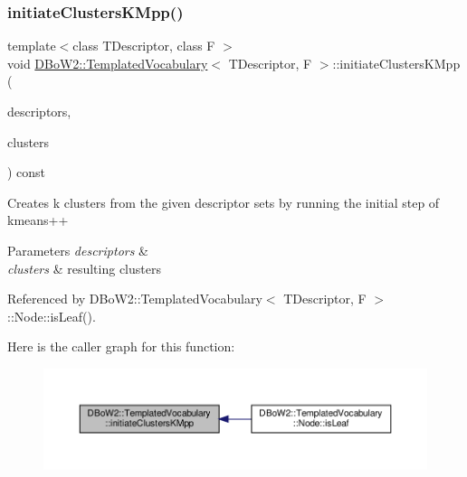 \subsubsection{\texorpdfstring{initiate\+Clusters\+K\+Mpp()}{initiateClustersKMpp()}}
{\footnotesize\ttfamily template$<$class T\+Descriptor, class F $>$ \\
void \hyperlink{classDBoW2_1_1TemplatedVocabulary}{D\+Bo\+W2\+::\+Templated\+Vocabulary}$<$ T\+Descriptor, F $>$\+::initiate\+Clusters\+K\+Mpp (\begin{DoxyParamCaption}\item[{const std\+::vector$<$ \hyperlink{classDBoW2_1_1TemplatedVocabulary_a40913d67e369e6993c2eab80a968f829}{p\+Descriptor} $>$ \&}]{descriptors,  }\item[{std\+::vector$<$ T\+Descriptor $>$ \&}]{clusters }\end{DoxyParamCaption}) const\hspace{0.3cm}{\ttfamily [protected]}}

Creates k clusters from the given descriptor sets by running the initial step of kmeans++ 
\begin{DoxyParams}{Parameters}
{\em descriptors} & \\
\hline
{\em clusters} & resulting clusters \\
\hline
\end{DoxyParams}


Referenced by D\+Bo\+W2\+::\+Templated\+Vocabulary$<$ T\+Descriptor, F $>$\+::\+Node\+::is\+Leaf().

Here is the caller graph for this function\+:\nopagebreak
\begin{figure}[H]
\begin{center}
\leavevmode
\includegraphics[width=350pt]{classDBoW2_1_1TemplatedVocabulary_ab22e6bcfb6a1e8330a90edd732617875_icgraph}
\end{center}
\end{figure}
\mbox{\label{classDBoW2_1_1TemplatedVocabulary_afdec2031c98b9109451b1454f73348b0}} 
